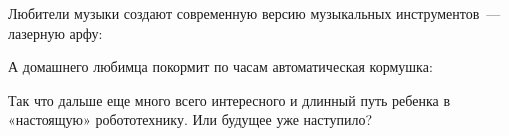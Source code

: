Любители музыки  создают современную версию музыкальных инструментов~--- лазерную арфу:\\
\href{http://arduino-projects.ru/projects/lazernaya-arfa/}{}

А домашнего любимца покормит по часам автоматическая кормушка:\\
\href{http://arduino-projects.ru/projects/kormyozhka-sobaki-cherez-tvitter/}{}

Так что дальше еще много всего интересного и длинный путь ребенка в «настоящую» робототехнику. Или будущее уже наступило?
